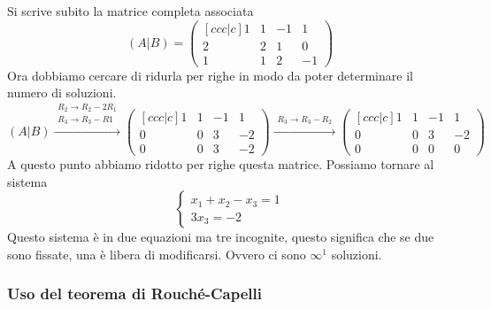 Si scrive subito la matrice completa associata
\begin{equation*}
  (A\vert B) =
  \begin{pmatrix}[ccc|c]
    1 & 1 & -1 & 1\\
    2 & 2 & 1 & 0\\
    1 & 1 & 2 & -1
  \end{pmatrix}
\end{equation*}
Ora dobbiamo cercare di ridurla per righe in modo da poter determinare il numero di
soluzioni.
\begin{equation*}
  (A\vert B)\xrightarrow{\substack{R_2\to R_2-2R_1\\R_3\to R_3-R1}}
  \begin{pmatrix}[ccc|c]
    1 & 1 & -1 & 1\\
    0 & 0 & 3 & -2\\
    0 & 0 & 3 & -2
  \end{pmatrix}\xrightarrow{\substack{R_3\to R_3-R_2}}
  \begin{pmatrix}[ccc|c]
    1 & 1 & -1 & 1\\
    0 & 0 & 3 & -2\\
    0 & 0 & 0 & 0
  \end{pmatrix}
\end{equation*}
A questo punto abbiamo ridotto per righe questa matrice. Possiamo tornare al sistema
\begin{equation*}
  \begin{cases}
    x_1+x_2-x_3=1\\
    3x_3=-2
  \end{cases}
\end{equation*}
Questo sistema è in due equazioni ma tre incognite, questo significa che se due sono
fissate, una è libera di modificarsi. Ovvero ci sono $\infty^1$ soluzioni.

\subsubsection{Uso del teorema di Rouché-Capelli}%
\label{sub:uso_del_teorema_di_rouche_capelli}

